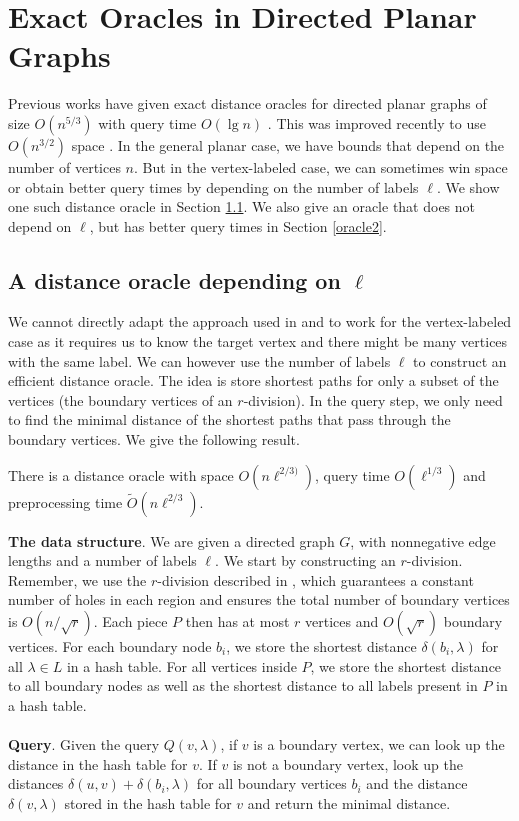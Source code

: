\section{Exact Oracles in Directed Planar Graphs}\label{exactPlanar}
Previous works have given exact distance oracles for directed planar graphs of size
$O(n^{5/3})$ with query time $O(\lg n)$ \cite{cohen2017fast}. This was improved recently
to use $O(n^{3/2})$ space \cite{gawrychowski2017better}. In the general planar case, we have
bounds that depend on the number of vertices $n$. But in the vertex-labeled case, we can
sometimes win space or obtain better query times by depending on the number of labels
$\ell$. We show one such distance oracle in Section \ref{oracle1}. We also give an oracle
that does not depend on $\ell$, but has better query times in Section \ref{oracle2}.

\subsection{A distance oracle depending on $\ell$}\label{oracle1}
We cannot directly adapt the approach used in \cite{cohen2017fast} and \cite{gawrychowski2017better} to work
for the vertex-labeled case as it requires us to know the target vertex and there might
be many vertices with the same label. We can however use the number of labels $\ell$ to
construct an efficient distance oracle. The idea is store shortest paths for only a subset of the vertices (the boundary vertices of an $r$-division). In the query step, we only need to find the minimal
distance of the shortest paths that pass through the boundary vertices. We give the
following result.
\begin{thm}\label{thm1}
  There is a distance oracle with space $O(n\ell^{2/3)})$, query time $O(\ell^{1/3})$ and
  preprocessing time $\tilde{O}(n\ell^{2/3})$.
\end{thm}
\textbf{The data structure}.
We are given a directed graph $G$, with nonnegative edge lengths and a number of labels
$\ell$. We start by constructing an $r$-division. Remember, we use the $r$-division described in
\cite{klein2013structured}, which guarantees a constant number of holes in each region
and ensures the total number of boundary vertices is $O(n/\sqrt{r})$. Each piece $P$ then
has at most $r$ vertices and $O(\sqrt{r})$
boundary vertices. For each boundary node $b_i$, we store the shortest distance
$\delta(b_i,\lambda)$
for all $\lambda \in L$ in a hash table. For all vertices inside $P$, we store the shortest
distance to all boundary nodes as well as the shortest distance to all labels present in
$P$ in a hash table. \\
\\
\indent \textbf{Query}.
Given the query $Q(v, \lambda)$, if $v$ is a boundary vertex, we can look
up the distance in the hash table for $v$. If $v$ is not a boundary vertex, look up the
distances $\delta(u,v)+\delta(b_i,\lambda)$ for all boundary vertices $b_i$ and the distance
$\delta(v,\lambda)$ stored in the hash table for $v$ and return the minimal distance.

